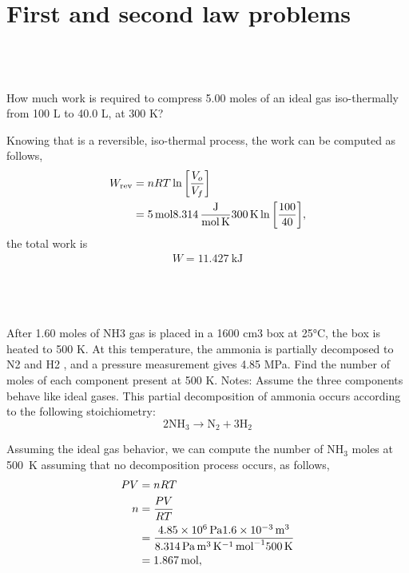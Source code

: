 \documentclass[main.tex]{subfiles}
\begin{document}
\section{First and second law problems}

\subsection{~}
How much work is required to compress 5.00 moles of an ideal gas iso-thermally from 100 L to 40.0 L, at 300 K?

Knowing that is a reversible, iso-thermal process, the work can be computed as follows,
\begin{align*}
    W_{\mathrm{rev}} &= nRT\ln\qty[\frac{V_{o}}{V_f}] \\
    &= \SI{5}{\mol}\SI[per-mode=fraction]{8.314}{\joule\per\mole\per\kelvin}\SI{300}{\kelvin}\ln\qty[\frac{100}{40}],
\end{align*}
the total work is
\begin{gather*}
    \boxed{W = \SI{11.427}{\kilo\joule}}
\end{gather*}


\subsection{~}
After 1.60 moles of NH3 gas is placed in a 1600 cm3 box at 25°C, the box is heated to 500 K. 
At this temperature, the ammonia is partially decomposed to N2 and H2 , and a pressure measurement gives 4.85 MPa. 
Find the number of moles of each component present at 500 K.
Notes: Assume the three components behave like ideal gases.
This partial decomposition of ammonia occurs according to the following stoichiometry:
$$2\mathrm{NH}_3\to \mathrm{N}_2+3\mathrm{H}_2$$

Assuming the ideal gas behavior, we can compute the number of $\mathrm{NH}_3$ moles at \SI{500}{\kelvin} assuming that no decomposition process occurs, as follows,
\begin{align*}
    PV &= nRT \\
    n &= \frac{PV}{RT} \\
    &= \frac{\SI{4.85d6}{\pascal}\SI{1.6d-3}{\meter\tothe{3}}}{\SI{8.314}{\pascal\meter\tothe{3}\per\kelvin\per\mol}\SI{500}{\kelvin}} \\
    &= \SI{1.867}{\mol},
\end{align*}
\end{document}
